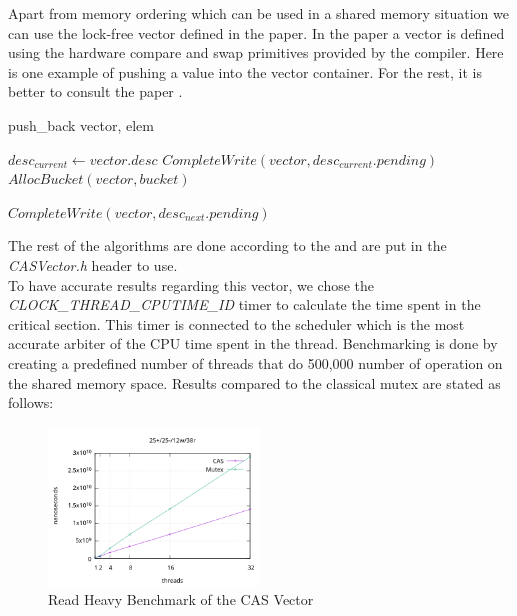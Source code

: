 \documentclass[a4paper, 11pt, twocolumn]{article}
\theoremstyle{nonumberplain}
\begin{document}
Apart from memory ordering which can be used in a shared memory situation
we can use the lock-free vector defined in the \cite{cas} paper.
In the \cite{cas} paper a vector is defined using the hardware 
compare and swap primitives provided by the compiler. Here is one example
of pushing a value into the vector container. For the rest, it is better to
consult the paper \cite{cas}.
\begin{algorithm}[h]
    \caption{push\_back vector, elem}
    \begin{algorithmic}
        \Repeat
        \State $desc_{current} \gets vector.desc$
        \State $CompleteWrite(vector, desc_{current}.pending)$
            \State $AllocBucket(vector, bucket)$
        \EndIf
        \State {}
        \State {}
        \State $CompleteWrite(vector, desc_{next}.pending)$
    \end{algorithmic}
\end{algorithm}
The rest of the algorithms are done according to the \cite{cas} and are put in the
\textit{CASVector.h} header to use. \\
To have accurate results regarding this vector, we chose the
\textit{CLOCK\_THREAD\_CPUTIME\_ID} timer to calculate the time spent in
the critical section. This timer is connected to the scheduler which is the
most accurate arbiter of the CPU time spent in the thread.
Benchmarking is done by creating a predefined number of threads 
that do 500,000 number of operation on the shared memory space.
Results compared to the classical mutex are stated as follows:
\begin{figure}[H]
    \centering
    \includegraphics[width=0.5\textwidth]{res1.png}
    \caption{Read Heavy Benchmark of the CAS Vector}
\end{figure}
\end{document}
